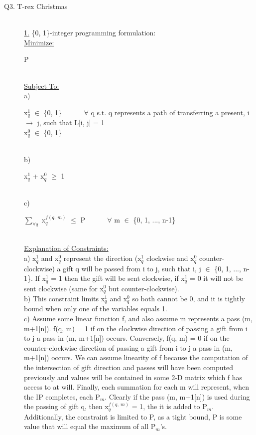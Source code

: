 \documentclass[10pt]{csc_assignment}
\begin{document}
\begin{description}

\newpage
\item[Q3. T-rex Christmas]
~\\
\underline{1.} \{0, 1\}-integer programming formulation:\\
\underline{Minimize:}\\
\hspace*{1cm}\parbox{15cm}{
P
}\\
\underline{Subject To:}\\
a) \\
\hspace*{1cm}\parbox{15cm}{
x$_{q}^1$ $\in$ \{0, 1\} ~~~~~ $\forall$ q s.t. q represents a path of transferring a present, i $\rightarrow$ j, such that L[i, j] = 1\\
x$_{q}^0$ $\in$ \{0, 1\} 
}\\
b)\\
\hspace*{1cm}\parbox{15cm}{
x$_{q}^1$ + x$_{q}^0$ $\geqslant$ 1\\
}\\
c)\\
\hspace*{1cm}\parbox{15cm}{
$\sum_{\forall q}$ x$_{q}^{f(q,~ m)}$ $\leqslant$ P ~~~~~ $\forall$ m $\in$ \{0, 1, ..., n-1\}\\
}\\
\underline{Explanation of Constraints:}\\
a) x$_{q}^1$ and x$_{q}^0$ represent the direction (x$_{q}^1$ clockwise and x$_{q}^0$ counter-clockwise) a gift q will be passed from i to j, such that i, j $\in$ \{0, 1, ..., n-1\}. If x$_{q}^1$ = 1 then the gift will be sent clockwise, if x$_{q}^1$ = 0 it will not be sent clockwise (same for x$_{q}^0$ but counter-clockwise).\\
b) This constraint limits x$_{q}^1$ and x$_{q}^0$ so both cannot be 0, and it is tightly bound when only one of the variables equals 1.\\
c) Assume some linear function f, and also assume m represents a pass (m, m+1[n]). f(q, m) = 1 if on the clockwise direction of passing a gift from i to j a pass in (m, m+1[n]) occurs. Conversely, f(q, m) = 0 if on the counter-clockwise direction of passing a gift from i to j a pass in (m, m+1[n]) occurs. We can assume linearity of f because the computation of the intersection of gift direction and passes will have been computed previously and values will be contained in some 2-D matrix which f has access to at will. Finally, each summation for each m will represent, when the IP completes, each P$_{m}$. Clearly if the pass (m, m+1[n]) is used during the passing of gift q, then x$_{q}^{f(q,~ m)}$ = 1, the it is added to P$_{m}$. Additionally, the constraint is limited to P, as a tight bound, P is some value that will equal the maximum of all P$_{m}$'s.\\ 


\end{description}
\end{document}

